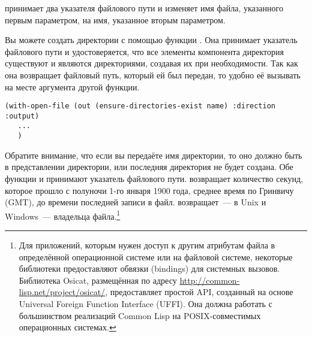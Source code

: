  принимает два указателя файлового пути и изменяет имя файла, указанного
первым параметром, на имя, указанное вторым параметром.

Вы можете создать директории с помощью функции . Она
принимает указатель файлового пути и удостоверяется, что все элементы компонента
директория существуют и являются директориями, создавая их при необходимости. Так как она
возвращает файловый путь, который ей был передан, то удобно её вызывать на месте аргумента
другой функции.

\begin{lstlisting}
(with-open-file (out (ensure-directories-exist name) :direction :output) 
   ... 
   ) 
\end{lstlisting}

Обратите внимание, что если вы передаёте  имя директории,
то оно должно быть в представлении директории, или последняя директория не будет
создана. Обе функции  и  принимают указатель
файлового пути.  возвращает количество секунд, которое прошло с
полуночи 1-го января 1900 года, среднее время по Гринвичу (GMT), до времени последней
записи в файл.  возвращает~--- в Unix и Windows~--- владельца
файла.\footnote{Для приложений, которым нужен доступ к другим атрибутам файла в
  определённой операционной системе или на файловой системе, некоторые библиотеки
  предоставляют обвязки (bindings) для системных вызовов. Библиотека Osicat, размещённая
  по адресу \url{http://common-lisp.net/project/osicat/}, предоставляет простой API,
  созданный на основе Universal Foreign Function Interface (UFFI). Она должна работать с
  большинством реализаций Common Lisp на POSIX-совместимых операционных системах.}

